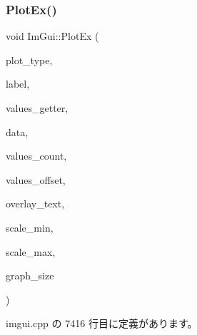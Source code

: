 \subsubsection{\texorpdfstring{Plot\+Ex()}{PlotEx()}}
{\footnotesize\ttfamily void Im\+Gui\+::\+Plot\+Ex (\begin{DoxyParamCaption}\item[{\mbox{\hyperlink{imgui__internal_8h_a9d5efcdd8895aa3544f1e8ce366c2728}{Im\+Gui\+Plot\+Type}}}]{plot\+\_\+type,  }\item[{const char $\ast$}]{label,  }\item[{float($\ast$)(void $\ast$data, int idx)}]{values\+\_\+getter,  }\item[{void $\ast$}]{data,  }\item[{int}]{values\+\_\+count,  }\item[{int}]{values\+\_\+offset,  }\item[{const char $\ast$}]{overlay\+\_\+text,  }\item[{float}]{scale\+\_\+min,  }\item[{float}]{scale\+\_\+max,  }\item[{\mbox{\hyperlink{struct_im_vec2}{Im\+Vec2}}}]{graph\+\_\+size }\end{DoxyParamCaption})}



 imgui.\+cpp の 7416 行目に定義があります。

